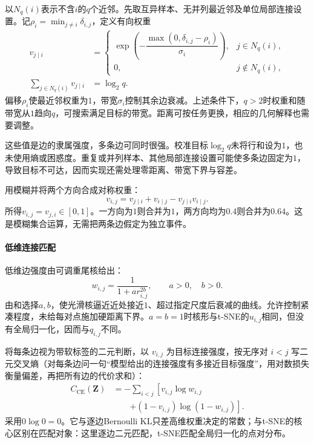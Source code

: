 以$N_q(i)$表示不含$i$的$q$个近邻。先取互异样本、无并列最近邻及单位局部连接设置。记$\rho_i=\min_{j\ne i}\delta_{i,j}$，定义有向权重
\begin{equation}
  \label{eq:dim-umap-directed}
  \begin{aligned}
    v_{j\mid i}
      &=
      \begin{cases}
        \exp\!\left(-\dfrac{\max(0,\delta_{i,j}-\rho_i)}
        {\sigma_i}\right),&j\in N_q(i),\\
        0,&j\notin N_q(i),
      \end{cases}\\
    \sum_{j\in N_q(i)}v_{j\mid i}&=\log_2 q.
  \end{aligned}
\end{equation}
偏移$\rho_i$使最近邻权重为$1$，带宽$\sigma_i$控制其余边衰减。上述条件下，$q>2$时权重和随带宽从$1$趋向$q$，可搜索满足目标的带宽。距离可按任务更换，相应的几何解释也需要调整。

这些值是边的隶属强度，多条边可同时很强。校准目标$\log_2 q$未将行和设为$1$，也未使用熵或困惑度。重复或并列样本、其他局部连接设置可能使多条边固定为$1$，导致目标不可达，因而实现还需处理零距离、带宽下界与容差。

用模糊并将两个方向合成对称权重：
\begin{equation}
  \label{eq:dim-umap-union}
  v_{i,j}=v_{j\mid i}+v_{i\mid j}-v_{j\mid i}v_{i\mid j}.
\end{equation}
所得$v_{i,j}=v_{j,i}\in[0,1]$。一方向为$1$则合并为$1$，两方向均为$0.4$则合并为$0.64$。这是模糊集合运算，无需把两条边假定为独立事件。

\paragraph{低维连接匹配}

低维边强度由可调重尾核给出：
\begin{equation}
  \label{eq:dim-umap-kernel}
  w_{i,j}=\frac{1}{1+a r_{i,j}^{2b}},\qquad a>0,\quad b>0.
\end{equation}
由和选择$a,b$，使光滑核逼近近处接近$1$、超过指定尺度后衰减的曲线。允许控制紧凑程度，未给每对点施加硬距离下界。$a=b=1$时核形与t-SNE的$u_{i,j}$相同，但没有全局归一化，因而与$q_{i,j}$不同。

将每条边视为带软标签的二元判断，以 $v_{i,j}$ 为目标连接强度，按无序对 $i<j$ 写二元交叉熵（对每条边问一句“模型给出的连接强度有多接近目标强度”，用对数损失衡量偏差，再把所有边的代价求和）：
\begin{equation}
  \label{eq:dim-umap-cross-entropy}
  \begin{aligned}
    C_{\mathrm{CE}}(\bm{Z})
      &=-\sum_{i<j}\left[
        v_{i,j}\log w_{i,j}\right.\\
      &\qquad\left.+
        (1-v_{i,j})\log(1-w_{i,j})\right].
  \end{aligned}
\end{equation}
采用$0\log0=0$。它与逐边Bernoulli KL只差高维权重决定的常数；与t-SNE的核心区别在匹配对象：这里逐边二元匹配，t-SNE匹配全局归一化的点对分布。

